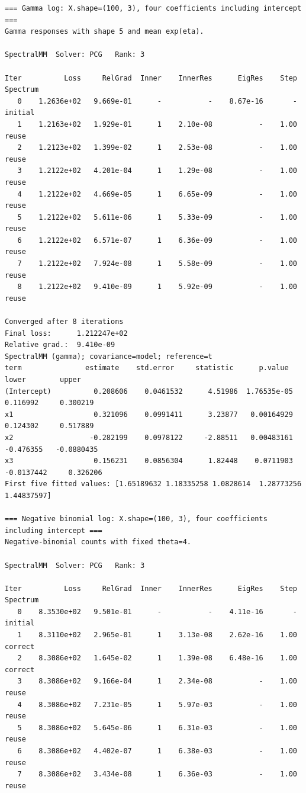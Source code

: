 \documentclass[11pt]{article}
\begin{document}
\begin{lstlisting}
=== Gamma log: X.shape=(100, 3), four coefficients including intercept ===
Gamma responses with shape 5 and mean exp(eta).

SpectralMM  Solver: PCG   Rank: 3

Iter          Loss     RelGrad  Inner    InnerRes      EigRes    Step  Spectrum
   0    1.2636e+02   9.669e-01      -           -    8.67e-16       -  initial
   1    1.2163e+02   1.929e-01      1    2.10e-08           -    1.00  reuse
   2    1.2123e+02   1.399e-02      1    2.53e-08           -    1.00  reuse
   3    1.2122e+02   4.201e-04      1    1.29e-08           -    1.00  reuse
   4    1.2122e+02   4.669e-05      1    6.65e-09           -    1.00  reuse
   5    1.2122e+02   5.611e-06      1    5.33e-09           -    1.00  reuse
   6    1.2122e+02   6.571e-07      1    6.36e-09           -    1.00  reuse
   7    1.2122e+02   7.924e-08      1    5.58e-09           -    1.00  reuse
   8    1.2122e+02   9.410e-09      1    5.92e-09           -    1.00  reuse

Converged after 8 iterations
Final loss:      1.212247e+02
Relative grad.:  9.410e-09
SpectralMM (gamma); covariance=model; reference=t
term               estimate    std.error     statistic      p.value        lower        upper
(Intercept)          0.208606    0.0461532      4.51986  1.76535e-05     0.116992     0.300219
x1                   0.321096    0.0991411      3.23877   0.00164929     0.124302     0.517889
x2                  -0.282199    0.0978122     -2.88511   0.00483161    -0.476355   -0.0880435
x3                   0.156231    0.0856304      1.82448    0.0711903   -0.0137442     0.326206
First five fitted values: [1.65189632 1.18335258 1.0828614  1.28773256 1.44837597]

=== Negative binomial log: X.shape=(100, 3), four coefficients including intercept ===
Negative-binomial counts with fixed theta=4.

SpectralMM  Solver: PCG   Rank: 3

Iter          Loss     RelGrad  Inner    InnerRes      EigRes    Step  Spectrum
   0    8.3530e+02   9.501e-01      -           -    4.11e-16       -  initial
   1    8.3110e+02   2.965e-01      1    3.13e-08    2.62e-16    1.00  correct
   2    8.3086e+02   1.645e-02      1    1.39e-08    6.48e-16    1.00  correct
   3    8.3086e+02   9.166e-04      1    2.34e-08           -    1.00  reuse
   4    8.3086e+02   7.231e-05      1    5.97e-03           -    1.00  reuse
   5    8.3086e+02   5.645e-06      1    6.31e-03           -    1.00  reuse
   6    8.3086e+02   4.402e-07      1    6.38e-03           -    1.00  reuse
   7    8.3086e+02   3.434e-08      1    6.36e-03           -    1.00  reuse


\end{lstlisting}
\end{document}
